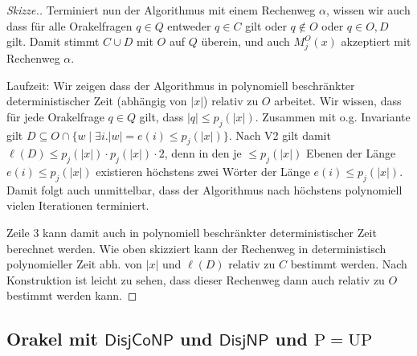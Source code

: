 \documentclass[nofonts]{uebung}
\def\P{\ensuremath{\mathrm{P}}}
\def\UP{\ensuremath{\mathrm{UP}}}
\def\hDisjNP{\ensuremath{\mathsf{DisjNP}}}
\def\hDisjCoNP{\ensuremath{\mathsf{DisjCoNP}}}
\begin{document}
\begin{proof}[Skizze.]
    Terminiert nun der Algorithmus mit einem Rechenweg $\alpha$, wissen wir auch dass für alle Orakelfragen $q\in Q$ entweder $q\in C$ gilt oder $q\not\in O$ oder $q\in O, D$ gilt.
    Damit stimmt $C\cup D$ mit $O$ auf $Q$ überein, und auch $M_j^O(x)$ akzeptiert mit Rechenweg $\alpha$.

    Laufzeit: Wir zeigen dass der Algorithmus in polynomiell beschränkter deterministischer Zeit (abhängig von $|x|$) relativ zu $O$ arbeitet. 
    Wir wissen, dass für jede Orakelfrage $q\in Q$ gilt, dass $|q|\leq p_j(|x|)$.
    Zusammen mit o.g. Invariante gilt $D\subseteq O\cap \{w \mid \exists i.|w|=e(i)\leq p_j(|x|)\}$.
    Nach V2 gilt damit $\ell(D)\leq p_j(|x|)\cdot p_j(|x|)\cdot 2$, denn in den je $\leq p_j(|x|)$ Ebenen der Länge $e(i)\leq p_j(|x|)$ existieren höchstens zwei Wörter der Länge $e(i)\leq p_j(|x|)$.
    Damit folgt auch unmittelbar, dass der Algorithmus nach höchstens polynomiell vielen Iterationen terminiert.

    Zeile 3 kann damit auch in polynomiell beschränkter deterministischer Zeit berechnet werden. Wie oben skizziert kann der Rechenweg in deterministisch polynomieller Zeit abh. von $|x|$ und $\ell(D)$ relativ zu $C$ bestimmt werden.
    Nach Konstruktion ist leicht zu sehen, dass dieser Rechenweg dann auch relativ zu $O$ bestimmt werden kann.
\end{proof}

\clearpage

\subsection*{Orakel mit $\hDisjCoNP$ und $\hDisjNP$ und $\P=\UP$}
\setcounter{theorem}{0}
\end{document}
